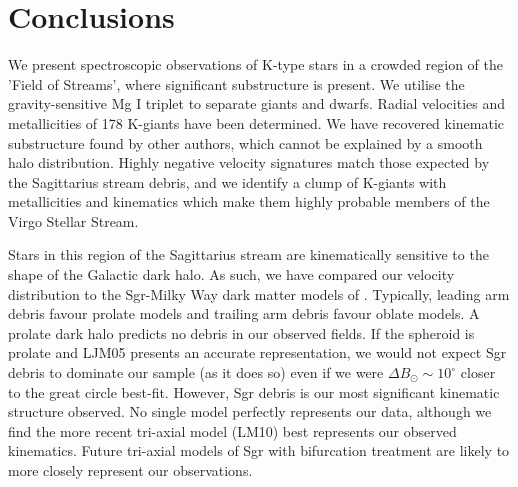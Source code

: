 \documentclass[preprint2]{aastex}
\begin{document}
	
\section{Conclusions}
\label{sec:conclusions}

	We present spectroscopic observations of K-type stars in a crowded region of the 'Field of Streams', where significant substructure is present. We utilise the gravity-sensitive Mg I triplet to separate giants and dwarfs. Radial velocities and metallicities of 178 K-giants have been determined. We have recovered kinematic substructure found by other authors, which cannot be explained by a smooth halo distribution. Highly negative velocity signatures match those expected by the Sagittarius stream debris, and we identify a clump of K-giants with metallicities and kinematics which make them highly probable members of the Virgo Stellar Stream.

	Stars in this region of the Sagittarius stream are kinematically sensitive to the shape of the Galactic dark halo. As such, we have compared our velocity distribution to the Sgr-Milky Way dark matter models of \citet{Law;et-al_2005, Law;Majewski_2010}. Typically, leading arm debris favour prolate models and trailing arm debris favour oblate models. A prolate dark halo predicts no debris in our observed fields. If the spheroid is prolate and LJM05 presents an accurate representation, we would not expect Sgr debris to dominate our sample (as it does so) even if we were $\Delta{}B_\odot\sim10^\circ$ closer to the great circle best-fit. However, Sgr debris is our most significant kinematic structure observed. No single model perfectly represents our data, although we find the more recent tri-axial model (LM10) best represents our observed kinematics. Future tri-axial models of Sgr with bifurcation treatment are likely to more closely represent our observations.
	
\end{document}

